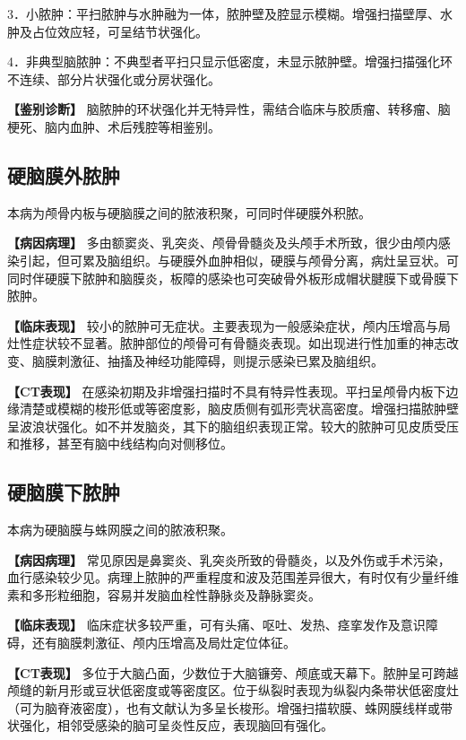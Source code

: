 3．小脓肿：平扫脓肿与水肿融为一体，脓肿壁及腔显示模糊。增强扫描壁厚、水肿及占位效应轻，可呈结节状强化。

4．非典型脑脓肿：不典型者平扫只显示低密度，未显示脓肿壁。增强扫描强化环不连续、部分片状强化或分房状强化。

\textbf{【鉴别诊断】}
脑脓肿的环状强化并无特异性，需结合临床与胶质瘤、转移瘤、脑梗死、脑内血肿、术后残腔等相鉴别。

\subsection{硬脑膜外脓肿}

本病为颅骨内板与硬脑膜之间的脓液积聚，可同时伴硬膜外积脓。

\textbf{【病因病理】}
多由额窦炎、乳突炎、颅骨骨髓炎及头颅手术所致，很少由颅内感染引起，但可累及脑组织。与硬膜外血肿相似，硬膜与颅骨分离，病灶呈豆状。可同时伴硬膜下脓肿和脑膜炎，板障的感染也可突破骨外板形成帽状腱膜下或骨膜下脓肿。

\textbf{【临床表现】}
较小的脓肿可无症状。主要表现为一般感染症状，颅内压增高与局灶性症状较不显著。脓肿部位的颅骨可有骨髓炎表现。如出现进行性加重的神志改变、脑膜刺激征、抽搐及神经功能障碍，则提示感染已累及脑组织。

\textbf{【CT表现】}
在感染初期及非增强扫描时不具有特异性表现。平扫呈颅骨内板下边缘清楚或模糊的梭形低或等密度影，脑皮质侧有弧形壳状高密度。增强扫描脓肿壁呈波浪状强化。如不并发脑炎，其下的脑组织表现正常。较大的脓肿可见皮质受压和推移，甚至有脑中线结构向对侧移位。

\subsection{硬脑膜下脓肿}

本病为硬脑膜与蛛网膜之间的脓液积聚。

\textbf{【病因病理】}
常见原因是鼻窦炎、乳突炎所致的骨髓炎，以及外伤或手术污染，血行感染较少见。病理上脓肿的严重程度和波及范围差异很大，有时仅有少量纤维素和多形粒细胞，容易并发脑血栓性静脉炎及静脉窦炎。

\textbf{【临床表现】}
临床症状多较严重，可有头痛、呕吐、发热、痉挛发作及意识障碍，还有脑膜刺激征、颅内压增高及局灶定位体征。

\textbf{【CT表现】}
多位于大脑凸面，少数位于大脑镰旁、颅底或天幕下。脓肿呈可跨越颅缝的新月形或豆状低密度或等密度区。位于纵裂时表现为纵裂内条带状低密度灶（可为脑脊液密度），也有文献认为多呈长梭形。增强扫描软膜、蛛网膜线样或带状强化，相邻受感染的脑可呈炎性反应，表现脑回有强化。

